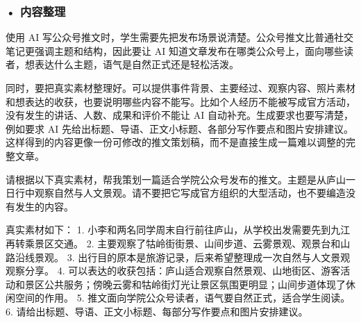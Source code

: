 \subsubsection*{\textbf{• 内容整理}}

使用 AI 写公众号推文时，学生需要先把发布场景说清楚。公众号推文比普通社交笔记更强调主题和结构，因此要让 AI 知道文章发布在哪类公众号上，面向哪些读者，想表达什么主题，语气是自然正式还是轻松活泼。

同时，要把真实素材整理好。可以提供事件背景、主要经过、观察内容、照片素材和想表达的收获，也要说明哪些内容不能写。比如个人经历不能被写成官方活动，没有发生的讲话、人数、成果和评价不能让 AI 自动补充。生成要求也要写清楚，例如要求 AI 先给出标题、导语、正文小标题、各部分写作要点和图片安排建议。这样得到的内容更像一份可修改的推文策划稿，而不是直接生成一篇难以调整的完整文章。

\begin{userbox}
请根据以下真实素材，帮我策划一篇适合学院公众号发布的推文。主题是从庐山一日行中观察自然与人文景观。请不要把它写成官方组织的大型活动，也不要编造没有发生的内容。

真实素材如下：
1. 小李和两名同学周末自行前往庐山，从学校出发需要先到九江再转乘景区交通。
2. 主要观察了牯岭街街景、山间步道、云雾景观、观景台和山路沿线景观。
3. 出行目的原本是旅游记录，后来希望整理成一次自然与人文景观观察分享。
4. 可以表达的收获包括：庐山适合观察自然景观、山地街区、游客活动和景区公共服务；傍晚云雾和牯岭街灯光让景区氛围更明显；山间步道体现了休闲空间的作用。
5. 推文面向学院公众号读者，语气要自然正式，适合学生阅读。
6. 请给出标题、导语、正文小标题、每部分写作要点和图片安排建议。
\end{userbox}

